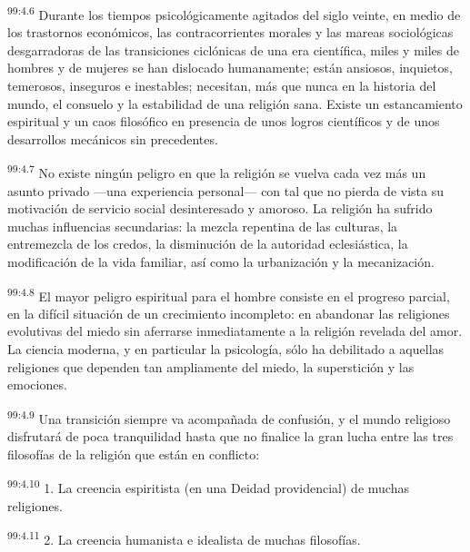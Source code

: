 \par
\textsuperscript{99:4.6} Durante los tiempos psicológicamente agitados del siglo veinte, en medio de los trastornos económicos, las contracorrientes morales y las mareas sociológicas desgarradoras de las transiciones ciclónicas de una era científica, miles y miles de hombres y de mujeres se han dislocado humanamente; están ansiosos, inquietos, temerosos, inseguros e inestables; necesitan, más que nunca en la historia del mundo, el consuelo y la estabilidad de una religión sana. Existe un estancamiento espiritual y un caos filosófico en presencia de unos logros científicos y de unos desarrollos mecánicos sin precedentes.

\par
\textsuperscript{99:4.7} No existe ningún peligro en que la religión se vuelva cada vez más un asunto privado ---una experiencia personal--- con tal que no pierda de vista su motivación de servicio social desinteresado y amoroso. La religión ha sufrido muchas influencias secundarias: la mezcla repentina de las culturas, la entremezcla de los credos, la disminución de la autoridad eclesiástica, la modificación de la vida familiar, así como la urbanización y la mecanización.

\par
\textsuperscript{99:4.8} El mayor peligro espiritual para el hombre consiste en el progreso parcial, en la difícil situación de un crecimiento incompleto: en abandonar las religiones evolutivas del miedo sin aferrarse inmediatamente a la religión revelada del amor. La ciencia moderna, y en particular la psicología, sólo ha debilitado a aquellas religiones que dependen tan ampliamente del miedo, la superstición y las emociones.

\par
\textsuperscript{99:4.9} Una transición siempre va acompañada de confusión, y el mundo religioso disfrutará de poca tranquilidad hasta que no finalice la gran lucha entre las tres filosofías de la religión que están en conflicto:

\par
\textsuperscript{99:4.10} 1. La creencia espiritista (en una Deidad providencial) de muchas religiones.

\par
\textsuperscript{99:4.11} 2. La creencia humanista e idealista de muchas filosofías.

